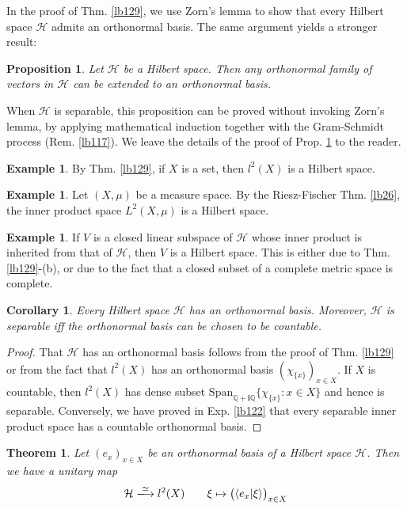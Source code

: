 \documentclass[12pt,b5paper,notitlepage]{article}
\theoremstyle{definition}
\newtheorem{eg}[df]{Example}
\theoremstyle{plain}
\newtheorem{thm}[df]{Theorem}
\newtheorem{pp}[df]{Proposition}
\newtheorem{co}[df]{Corollary}
\newcommand{\mc}{\mathcal}
\newcommand{\Span}{\mathrm{Span}}
\newcommand{\bk}[1]{\langle {#1}\rangle}
\newcommand{\im}{\mathbf{i}}
\newcommand{\Qbb}{\mathbb Q}
\newcommand{\MH}{\mathcal H}
\numberwithin{equation}{section}
\begin{document}
In the proof of Thm. \ref{lb129}, we use Zorn's lemma to show that every Hilbert space $\MH$ admits an orthonormal basis. The same argument yields a stronger result:

\begin{pp}\label{lb137}
Let $\MH$ be a Hilbert space. Then any orthonormal family of vectors in $\MH$ can be extended to an orthonormal basis.
\end{pp}

When $\MH$ is separable, this proposition can be proved without invoking Zorn's lemma, by applying mathematical induction together with the Gram-Schmidt process (Rem. \ref{lb117}). We leave the details of the proof of Prop. \ref{lb137} to the reader.



\begin{eg}
By Thm. \ref{lb129}, if $X$ is a set, then $l^2(X)$ is a Hilbert space.
\end{eg}


\begin{eg}
Let $(X,\mu)$ be a measure space. By the Riesz-Fischer Thm. \ref{lb26}, the inner product space $L^2(X,\mu)$ is a Hilbert space.
\end{eg}

\begin{eg}\label{lb148}
If $V$ is a closed linear subspace of $\MH$ whose inner product is inherited from that of $\MH$, then $V$ is a Hilbert space. This is either due to Thm. \ref{lb129}-(b), or due to the fact that a closed subset of a complete metric space is complete.
\end{eg}


\begin{co}\label{lb130}
Every Hilbert space $\mc H$ has an orthonormal basis. Moreover, $\mc H$ is separable iff the orthonormal basis can be chosen to be countable.
\end{co}

\begin{proof}
That $\mc H$ has an orthonormal basis follows from the proof of Thm. \ref{lb129} or from the fact that $l^2(X)$ has an orthonormal basis $(\chi_{\{x\}})_{x\in X}$. If $X$ is countable, then $l^2(X)$ has dense subset $\Span_{\Qbb+\im\Qbb}\{\chi_{\{x\}}:x\in X\}$ and hence is separable. Conversely, we have proved in Exp. \ref{lb122} that every separable inner product space has a countable orthonormal basis.
\end{proof}


\begin{thm}\label{lb131}
Let $(e_x)_{x\in X}$ be an orthonormal basis of a Hilbert space $\mc H$. Then we have a unitary map
\begin{gather}
\mc H\xlongrightarrow{\simeq} l^2(X)\qquad \xi\mapsto\big(\bk{e_x|\xi}\big)_{x\in X}
\end{gather}
\end{thm}
\end{document}
